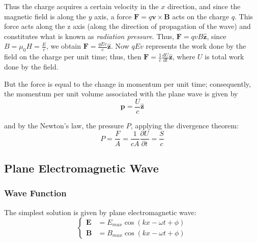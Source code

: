 \documentclass[UTF8]{book}
\begin{document}
Thus the charge acquires a certain velocity in the $x$ direction, and since the magnetic field is along the $y$ axis, a force $\mathbf{F}=q\mathbf{v}\times \mathbf{B}$ acts on the charge $q$. This force acts along the z axis (along the direction of propagation of the wave) and constitutes what is known as \emph{radiation pressure}. Thus, $\mathbf{F}=qvB\hat{\mathbf{z}}$, since $B=\mu _0H=\frac{E}{c}$, we obtain $\mathbf{F}=\frac{qEv}{c}\hat{\mathbf{z}}$. Now $qEv$ represents the work done by the field on the charge per unit time; thus, then $\mathbf{F}=\frac{1}{c}\frac{dU}{dt}\hat{\mathbf{z}}$, where $U$ is total work done by the field.

But the force is equal to the change in momentum per unit time; consequently, the momentum per unit volume associated with the plane wave is given by
\[\mathbf{p}=\frac{U}{c}\hat{\mathbf{z}}\]

and by the Newton's law, the pressure $P$, applying the divergence theorem:
\[P=\frac{F}{A}=\frac{1}{cA}\frac{\partial U}{\partial t}=\frac{S}{c}\]
\subsection{Plane Electromagnetic Wave}
\subsubsection{Wave Function}
The simplest solution is given by plane electromagnetic wave:
\[ \begin{cases}
\mathbf{E}&=E_{max}\cos (kx-\omega t+\phi)\\
\mathbf{B}&=B_{max}\cos (kx-\omega t+\phi)
\end{cases} \]
\end{document}
